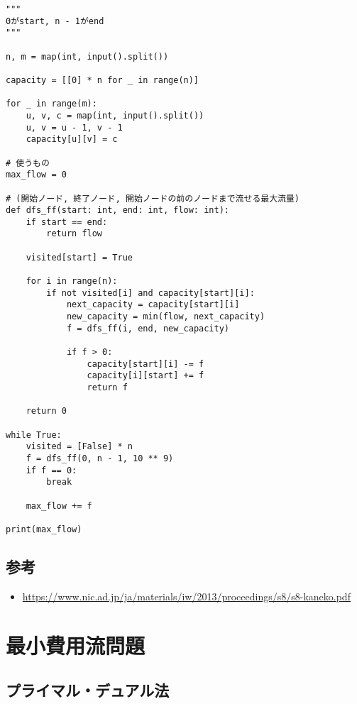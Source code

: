 \documentclass{jlreq}
\begin{document}
\begin{lstlisting}[caption=フォード・ファルカーソン法の実装, label=ford_fulkerson, frame=TRBL, label={ford_fulkerson}]
"""
0がstart, n - 1がend
"""
  
n, m = map(int, input().split())

capacity = [[0] * n for _ in range(n)]

for _ in range(m):
    u, v, c = map(int, input().split())
    u, v = u - 1, v - 1
    capacity[u][v] = c

# 使うもの
max_flow = 0

# (開始ノード, 終了ノード, 開始ノードの前のノードまで流せる最大流量)
def dfs_ff(start: int, end: int, flow: int):
    if start == end:
        return flow
    
    visited[start] = True

    for i in range(n):
        if not visited[i] and capacity[start][i]:
            next_capacity = capacity[start][i]
            new_capacity = min(flow, next_capacity)
            f = dfs_ff(i, end, new_capacity)

            if f > 0:
                capacity[start][i] -= f
                capacity[i][start] += f
                return f
        
    return 0

while True:
    visited = [False] * n
    f = dfs_ff(0, n - 1, 10 ** 9)
    if f == 0:
        break

    max_flow += f

print(max_flow)
\end{lstlisting}

\subsection{参考}

\begin{itemize}
  \item \url{https://www.nic.ad.jp/ja/materials/iw/2013/proceedings/s8/s8-kaneko.pdf}
\end{itemize}

\section{最小費用流問題}

\subsection{プライマル・デュアル法}
\end{document}

